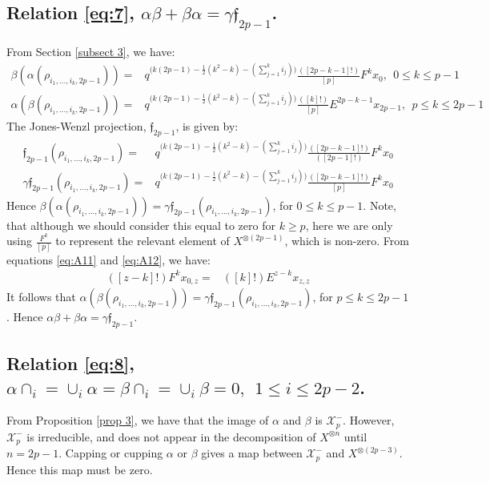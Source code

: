 \documentclass[]{article}
\begin{document}
\subsection{Relation \ref{eq:7}, $\alpha\beta+\beta\alpha=\gamma \mathfrak{f}_{2p-1}$. \label{subsect 6}}
From Section \ref{subsect 3}, we have:
\begin{align*}
\beta(\alpha(\rho_{i_{1},...,i_{k},2p-1}))=& q^{\big(k(2p-1)-\frac{1}{2}(k^{2}-k)-(\sum\limits_{j=1}^{k}i_{j})\big)}\frac{([2p-k-1]!)}{[p]}F^{k}x_{0}, \:\: 0\leq k\leq p-1\\
\alpha(\beta(\rho_{i_{1},...,i_{k},2p-1}))=& q^{\big(k(2p-1)-\frac{1}{2}(k^{2}-k)-(\sum\limits_{j=1}^{k}i_{j})\big)}\frac{([k]!)}{[p]}E^{2p-k-1}x_{2p-1}, \:\: p\leq k\leq 2p-1
\end{align*}
The Jones-Wenzl projection, $\mathfrak{f}_{2p-1}$, is given by:
\begin{align*}
\mathfrak{f}_{2p-1}(\rho_{i_{1},...,i_{k},2p-1})=& q^{\big(k(2p-1)-\frac{1}{2}(k^{2}-k)-(\sum\limits_{j=1}^{k}i_{j})\big)}\frac{([2p-k-1]!)}{([2p-1]!)}F^{k}x_{0}\\
\gamma \mathfrak{f}_{2p-1}(\rho_{i_{1},...,i_{k},2p-1})=& q^{\big(k(2p-1)-\frac{1}{2}(k^{2}-k)-(\sum\limits_{j=1}^{k}i_{j})\big)}\frac{([2p-k-1]!)}{[p]}F^{k}x_{0}
\end{align*}
Hence $\beta(\alpha(\rho_{i_{1},...,i_{k},2p-1}))=\gamma \mathfrak{f}_{2p-1}(\rho_{i_{1},...,i_{k},2p-1})$, for $0\leq k\leq p-1$. Note, that although we should consider this equal to zero for $k\geq p$, here we are only using $\frac{F^{k}}{[p]}$ to represent the relevant element of $X^{\otimes(2p-1)}$, which is non-zero. From equations \ref{eq:A11} and \ref{eq:A12}, we have:
\begin{align*}
([z-k]!)F^{k}x_{0,z}=&([k]!)E^{z-k}x_{z,z}
\end{align*}
It follows that $\alpha(\beta(\rho_{i_{1},...,i_{k},2p-1}))=\gamma \mathfrak{f}_{2p-1}(\rho_{i_{1},...,i_{k},2p-1})$, for $p\leq k\leq 2p-1$. Hence $\alpha\beta+\beta\alpha=\gamma \mathfrak{f}_{2p-1}$.


\subsection{Relation \ref{eq:8}, $\alpha\cap_{i}=\cup_{i}\alpha=\beta\cap_{i}=\cup_{i}\beta=0, \:\: 1\leq i\leq 2p-2$.}
From Proposition \ref{prop 3}, we have that the image of $\alpha$ and $\beta$ is $\mathcal{X}^{-}_{p}$. However, $\mathcal{X}^{-}_{p}$ is irreducible, and does not appear in the decomposition of $X^{\otimes n}$ until $n=2p-1$. Capping or cupping $\alpha$ or $\beta$ gives a map between $\mathcal{X}^{-}_{p}$ and $X^{\otimes(2p-3)}$. Hence this map must be zero. 
\end{document}
